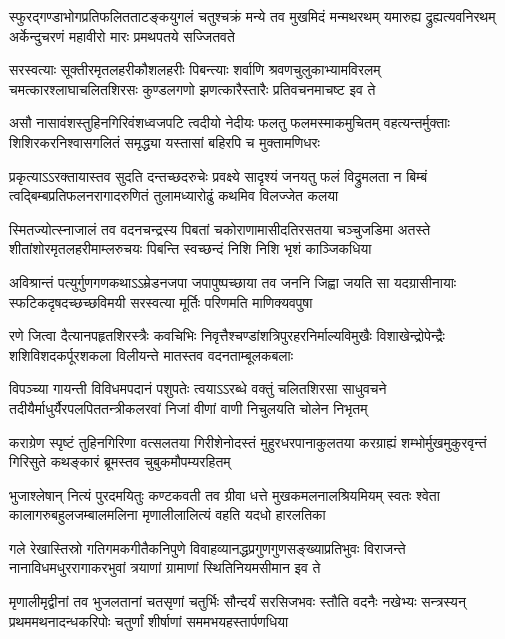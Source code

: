 \fourlineindentedshloka
{स्फुरद्गण्डाभोगप्रतिफलितताटङ्कयुगलं}
{चतुश्चक्रं मन्ये तव मुखमिदं मन्मथरथम्}
{यमारुह्य द्रुह्यत्यवनिरथम् अर्केन्दुचरणं}
{महावीरो मारः प्रमथपतये सज्जितवते}%

\fourlineindentedshloka
{सरस्वत्याः सूक्तीरमृतलहरीकौशलहरीः}
{पिबन्त्याः शर्वाणि श्रवणचुलुकाभ्यामविरलम्}
{चमत्कारश्लाघाचलितशिरसः कुण्डलगणो}
{झणत्कारैस्तारैः प्रतिवचनमाचष्ट इव ते}%

\fourlineindentedshloka
{असौ नासावंशस्तुहिनगिरिवंशध्वजपटि}
{त्वदीयो नेदीयः फलतु फलमस्माकमुचितम्}
{वहत्यन्तर्मुक्ताः शिशिरकरनिश्वासगलितं}
{समृद्ध्या यस्तासां बहिरपि च मुक्तामणिधरः}%

\fourlineindentedshloka
{प्रकृत्याऽऽरक्तायास्तव सुदति दन्तच्छदरुचेः}
{प्रवक्ष्ये सादृश्यं जनयतु फलं विद्रुमलता}
{न बिम्बं त्वद्बिम्बप्रतिफलनरागादरुणितं}
{तुलामध्यारोढुं कथमिव विलज्जेत कलया}%

\fourlineindentedshloka
{स्मितज्योत्स्नाजालं तव वदनचन्द्रस्य पिबतां}
{चकोराणामासीदतिरसतया चञ्चुजडिमा}
{अतस्ते शीतांशोरमृतलहरीमाम्लरुचयः}
{पिबन्ति स्वच्छन्दं निशि निशि भृशं काञ्जिकधिया}%

\fourlineindentedshloka
{अविश्रान्तं पत्युर्गुणगणकथाऽऽम्रेडनजपा}
{जपापुष्पच्छाया तव जननि जिह्वा जयति सा}
{यदग्रासीनायाः स्फटिकदृषदच्छच्छविमयी}
{सरस्वत्या मूर्तिः परिणमति माणिक्यवपुषा}%

\fourlineindentedshloka
{रणे जित्वा दैत्यानपहृतशिरस्त्रैः कवचिभिः}
{निवृत्तैश्चण्डांशत्रिपुरहरनिर्माल्यविमुखैः}
{विशाखेन्द्रोपेन्द्रैः शशिविशदकर्पूरशकला}
{विलीयन्ते मातस्तव वदनताम्बूलकबलाः}%

\fourlineindentedshloka
{विपञ्च्या गायन्ती विविधमपदानं पशुपतेः}
{त्वयाऽऽरब्धे वक्तुं चलितशिरसा साधुवचने}
{तदीयैर्माधुर्यैरपलपिततन्त्रीकलरवां}
{निजां वीणां वाणी निचुलयति चोलेन निभृतम्}%

\fourlineindentedshloka
{कराग्रेण स्पृष्टं तुहिनगिरिणा वत्सलतया}
{गिरीशेनोदस्तं मुहुरधरपानाकुलतया}
{करग्राह्यं शम्भोर्मुखमुकुरवृन्तं गिरिसुते}
{कथङ्कारं ब्रूमस्तव चुबुकमौपम्यरहितम्}%

\fourlineindentedshloka
{भुजाश्लेषान् नित्यं पुरदमयितुः कण्टकवती}
{तव ग्रीवा धत्ते मुखकमलनालश्रियमियम्}
{स्वतः श्वेता कालागरुबहुलजम्बालमलिना}
{मृणालीलालित्यं वहति यदधो हारलतिका}%

\fourlineindentedshloka
{गले रेखास्तिस्रो गतिगमकगीतैकनिपुणे}
{विवाहव्यानद्धप्रगुणगुणसङ्ख्याप्रतिभुवः}
{विराजन्ते नानाविधमधुररागाकरभुवां}
{त्रयाणां ग्रामाणां स्थितिनियमसीमान इव ते}%

\fourlineindentedshloka
{मृणालीमृद्वीनां तव भुजलतानां चतसृणां}
{चतुर्भिः सौन्दर्यं सरसिजभवः स्तौति वदनैः}
{नखेभ्यः सन्त्रस्यन् प्रथममथनादन्धकरिपोः}
{चतुर्णां शीर्षाणां सममभयहस्तार्पणधिया}%


